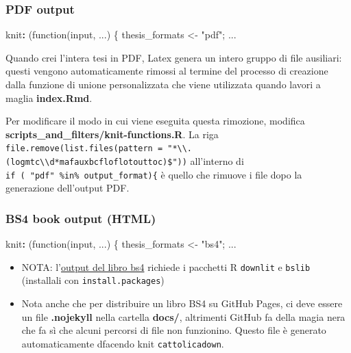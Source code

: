 \documentclass[a4paper, 11pt, nobind]{templates/ociamthesis}
\providecommand{\tightlist}{%
  \setlength{\itemsep}{0pt}\setlength{\parskip}{0pt}}
\newenvironment{Shaded}{\begin{snugshade}}{\end{snugshade}}
\newcommand{\AttributeTok}[1]{\textcolor[rgb]{0.77,0.63,0.00}{#1}}
\newcommand{\FunctionTok}[1]{\textcolor[rgb]{0.00,0.00,0.00}{#1}}
\newcommand{\KeywordTok}[1]{\textcolor[rgb]{0.13,0.29,0.53}{\textbf{#1}}}
\renewenvironment{Shaded}
{
  \vspace{10pt}%
  \begin{snugshade}%
}{%
  \end{snugshade}%
  \vspace{8pt}%
}
\begin{document}
\hypertarget{pdf-output}{%
\subsubsection{PDF output}\label{pdf-output}}

\begin{Shaded}
\begin{Highlighting}[]
\FunctionTok{knit}\KeywordTok{:}\AttributeTok{ (function(input, ...) \{}
\AttributeTok{    thesis\_formats \textless{}{-} "pdf";}
\AttributeTok{    ...}
\end{Highlighting}
\end{Shaded}

Quando crei l'intera tesi in PDF, Latex genera un intero gruppo di file ausiliari: questi vengono automaticamente rimossi al termine del processo di creazione dalla funzione di unione personalizzata che viene utilizzata quando lavori a maglia \textbf{index.Rmd}.

Per modificare il modo in cui viene eseguita questa rimozione, modifica \textbf{scripts\_and\_filters/knit-functions.R}.
La riga \texttt{file.remove(list.files(pattern\ =\ "*\textbackslash{}\textbackslash{}.(log\textbar{}mtc\textbackslash{}\textbackslash{}d*\textbar{}maf\textbar{}aux\textbar{}bcf\textbar{}lof\textbar{}lot\textbar{}out\textbar{}toc)\$"))} all'interno di \texttt{if\ (\ "pdf"\ \%in\%\ output\_format)\{} è quello che rimuove i file dopo la generazione dell'output PDF.

\hypertarget{bs4-book-output-html}{%
\subsubsection{BS4 book output (HTML)}\label{bs4-book-output-html}}

\begin{Shaded}
\begin{Highlighting}[]
\FunctionTok{knit}\KeywordTok{:}\AttributeTok{ (function(input, ...) \{}
\AttributeTok{    thesis\_formats \textless{}{-} "bs4";}
\AttributeTok{    ...}
\end{Highlighting}
\end{Shaded}

\begin{itemize}
\tightlist
\item
  NOTA: l'\href{https://pkgs.rstudio.com/bookdown/reference/bs4_book.html}{output del libro bs4} richiede i pacchetti R \texttt{downlit} e \texttt{bslib} (installali con \texttt{install.packages})
\item
  Nota anche che per distribuire un libro BS4 su GitHub Pages, ci deve essere un file \textbf{.nojekyll} nella cartella \textbf{docs/}, altrimenti GitHub fa della magia nera che fa sì che alcuni percorsi di file non funzionino. Questo file è generato automaticamente dfacendo knit \texttt{cattolicadown}.
\end{itemize}
\end{document}
